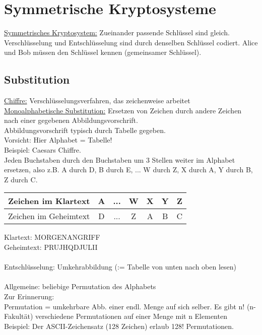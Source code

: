 \documentclass[a4paper,12pt]{article}
\begin{document}
\section{Symmetrische Kryptosysteme}

\underline{Symmetrisches Kryptosystem:} Zueinander passende Schlüssel sind gleich.\\
Verschlüsselung und Entschlüsselung sind durch denselben Schlüssel codiert. Alice und Bob müssen den Schlüssel kennen (\glqq gemeinsamer Schlüssel\grqq).

\subsection{Substitution}
\underline{Chiffre:} Verschlüsselungsverfahren, das zeichenweise arbeitet\\
\underline{Monoalphabetische Substitution:} Ersetzen von Zeichen durch andere Zeichen nach einer gegebenen Abbildungsvorschrift.\\
Abbildungsvorschrift typisch durch Tabelle gegeben.\\
Vorsicht: Hier Alphabet = Tabelle!\\
Beispiel: Caesars Chiffre.\\
Jeden Buchstaben durch den Buchstaben um 3 Stellen weiter im Alphabet ersetzen, also z.B. A durch D, B durch E, ... W durch Z, X durch A, Y durch B, Z durch C.\\
\begin{table}[h]
\centering
\begin{tabular}{l|c c c c c c}
Zeichen im Klartext & A & ... & W & X & Y & Z\\ \hline
Zeichen im Geheimtext & D & ... & Z & A & B & C\\
\end{tabular}
\end{table}
 Klartext: MORGENANGRIFF\\
 Geheimtext: PRUJHQDJULII\\
 \\
 Entschlüsselung: Umkehrabbildung (:= Tabelle von unten nach oben lesen)\\
 \\
Allgemeine: beliebige Permutation des Alphabets\\
Zur Erinnerung:\\
Permutation = umkehrbare Abb. einer endl. Menge auf sich selber. Es gibt n! (\glqq n-Fakultät\grqq) verschiedene Permutationen auf einer Menge mit n Elementen\\
Beispiel: Der ASCII-Zeichensatz (128 Zeichen) erlaub 128! Permutationen.
\end{document}
